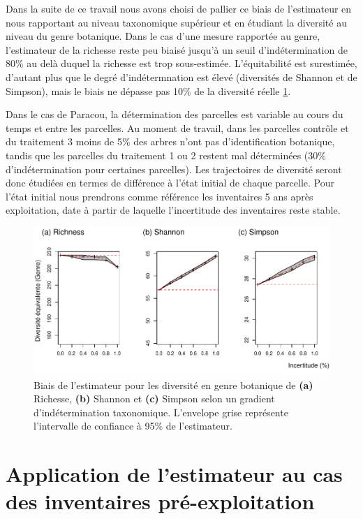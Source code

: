 \documentclass[
  11pt,
  french,
  A4paper,
  extrafontsizes,onecolumn,openright
  ]{memoir}
\begin{document}
Dans la suite de ce travail nous avons choisi de pallier ce biais de
l'estimateur en nous rapportant au niveau taxonomique supérieur et en
étudiant la diversité au niveau du genre botanique. Dans le cas d'une
mesure rapportée au genre, l'estimateur de la richesse reste peu biaisé
jusqu'à un seuil d'indétermination de 80\% au delà duquel la richesse
est trop sous-estimée. L'équitabilité est surestimée, d'autant plus que
le degré d'indétermnation est élevé (diversités de Shannon et de
Simpson), mais le biais ne dépasse pas 10\% de la diversité réelle
\ref{fig:FigTreesGenus}.

Dans le cas de Paracou, la détermination des parcelles est variable au
cours du temps et entre les parcelles. Au moment de travail, dans les
parcelles contrôle et du traitement 3 moins de 5\% des arbres n'ont pas
d'identification botanique, tandis que les parcelles du traitement 1 ou
2 restent mal déterminées (30\% d'indétermination pour certaines
parcelles). Les trajectoires de diversité seront donc étudiées en termes
de différence à l'état initial de chaque parcelle. Pour l'état initial
nous prendrons comme référence les inventaires 5 ans après exploitation,
date à partir de laquelle l'incertitude des inventaires reste stable.

\begin{figure}

{\centering \includegraphics[width=0.6\linewidth]{Manuscript_files/figure-latex/FigTreesGenus-1} 

}

\caption{Biais de l'estimateur pour les diversité en genre botanique de \textbf{(a)} Richesse, \textbf{(b)} Shannon et \textbf{(c)} Simpson selon un gradient d'indétermination taxonomique. L'envelope grise représente l'intervalle de confiance à 95\% de l'estimateur.}\label{fig:FigTreesGenus}
\end{figure}

\section{Application de l'estimateur au cas des inventaires
pré-exploitation}\label{application-de-lestimateur-au-cas-des-inventaires-pre-exploitation}
\end{document}
